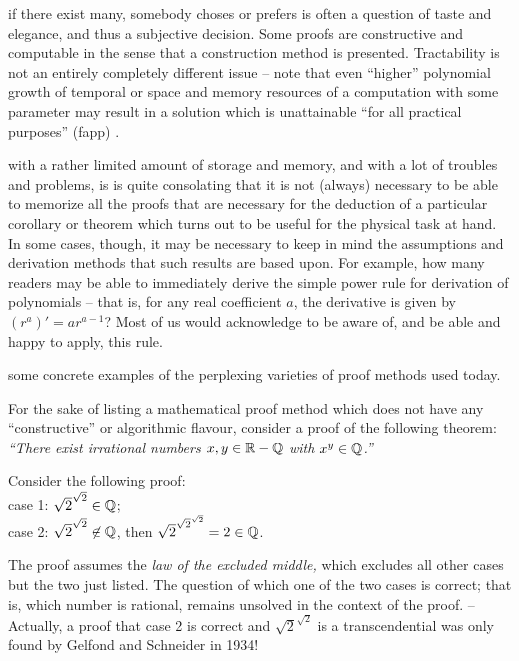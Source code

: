  if there exist many, somebody choses or prefers is often a question of taste and elegance, and thus a subjective decision.
Some proofs are constructive \cite{bridges-richman,bishop} and   computable \cite{aberth-80,Weihrauch,BHW08}
in the sense that a construction method is presented.
Tractability is not an entirely completely different issue \cite{kreisel,gandy2,pit:90}
--
note that even ``higher'' polynomial growth of temporal or space and memory resources of a computation with some parameter
may result in a solution which is unattainable ``for all practical purposes'' (fapp) \cite{bell-a}.

 with a rather limited amount of storage and memory,
and with a lot of troubles and problems, is is quite consolating that
it is not (always) necessary to be able to memorize all the proofs that are necessary for the deduction
of a particular
corollary or theorem which turns out to be useful for the physical task at hand.
In some cases, though, it may be necessary to keep in mind the assumptions and derivation
methods that such results are based upon.
For example, how many readers may be able to immediately derive
the simple power rule
for derivation of polynomials -- that is,  for any real coefficient $a$, the derivative is given by
$(r^a)' =a r^{a-1}$?
Most of us would acknowledge to be aware of, and be able and happy to apply, this rule.




 some concrete examples of the perplexing varieties of proof methods used today.


 For the sake of listing a mathematical proof method which
 does not have any ``constructive'' or algorithmic flavour, consider a proof of the
 following theorem: {\em ``There exist
 irrational numbers $x,y\in {\Bbb R} - {\Bbb Q}$ with $x^y\in {\Bbb Q}$.''}

{\color{OliveGreen}
\bproof
{Consider the following proof:}\\
case 1: $ \sqrt{2} ^{ \sqrt{2} } \in {\Bbb Q} $;
  \\
case 2: $ \sqrt{2} ^{
 \sqrt{2} } \not\in {\Bbb Q}$, then $ \sqrt{2} ^{{ \sqrt{2} } ^{ \sqrt{2} }}
 =2\in {\Bbb Q}$.
\eproof
}

The proof assumes the {\em law of the excluded middle,}
which excludes all other cases but the two just listed.
The question of which one of the two cases is correct; that is,
which number is rational, remains unsolved in the context of the proof.
--
Actually, a proof that case 2 is correct and  $\sqrt{2} ^{
 \sqrt{2} }$ is a transcendential was only found by  Gelfond and Schneider
in 1934!


